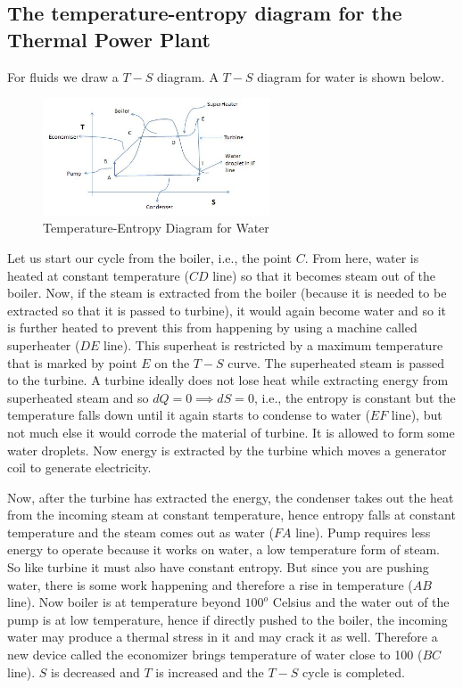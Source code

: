 \documentclass{report}
\begin{document}
\subsection{The temperature-entropy diagram for the Thermal Power Plant}
For fluids we draw a $T-S$ diagram. A $T-S$ diagram for water is shown below. 
\\
\begin{figure}[H]
\centering \includegraphics[width=0.6\textwidth]{captures/Capture2.JPG}
\caption{Temperature-Entropy Diagram for Water}
\end{figure}
\par Let us start our cycle from the boiler, i.e., the point $C$. From here, water is heated at constant temperature ($CD$ line) so that it becomes steam out of the boiler. Now, if the steam is extracted from the boiler (because it is needed to be extracted so that it is passed to turbine), it would again become water and so it is further heated to prevent this from happening by using a machine called superheater ($DE$ line). This superheat is restricted by a maximum temperature that is marked by point $E$ on the $T-S$ curve.  The superheated steam is passed to the turbine. A turbine ideally does not lose heat while extracting energy from superheated steam and so $dQ = 0 \implies dS = 0$, i.e., the entropy is constant but the temperature falls down until it again starts to condense to water ($EF$ line), but not much else it would corrode the material of turbine. It is allowed to form some water droplets. Now energy is extracted by the turbine which moves a generator coil to generate electricity.

\par Now, after the turbine has extracted the energy, the condenser takes out the heat from the incoming steam at constant temperature, hence entropy falls at constant temperature and the steam comes out as water ($FA$ line). Pump requires less energy to operate because it works on water, a low temperature form of steam. So like turbine it must also have constant entropy. But since you are pushing water, there is some work happening and therefore a rise in temperature ($AB$ line). Now boiler is at temperature beyond $100^{o}$ Celsius and the water out of the pump is at low temperature, hence if directly pushed to the boiler, the incoming water may produce a thermal stress in it and may crack it as well.  Therefore a new device called the economizer brings temperature of water close to 100 ($BC$ line). $S$ is decreased and $T$ is increased and the $T-S$ cycle is completed.
\end{document}
